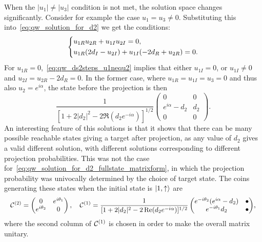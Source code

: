 When the $\lvert u_1 \rvert \neq \lvert u_3 \rvert$ condition is not met, the solution space changes significantly.
Consider for example the case $u_1 = u_3 \neq 0$. Substituting this into~\cref{eq:qw_solution_for_d2} we get the conditions:
\begin{equation}
	\begin{dcases}
		u_{1R}u_{2R} + u_{1I} u_{2I} = 0, \\
		u_{1R} (2d_I - u_{2I})
		+ u_{1I} (-2 d_R + u_{2R}) = 0.
	\end{dcases}
    \label{eq:qw_ds2steps_u1nequ2}
\end{equation}
For $u_{1R}=0$,~\cref{eq:qw_ds2steps_u1nequ2} implies that either $u_{1I}=0$,
or $u_{1I}\neq0$ and $u_{2I}=u_{2R}-2d_R=0$.
In the former case, where $u_{1R}=u_{1I}=u_3=0$ and thus also $u_2=e^{i\alpha}$, the state before the projection is then
\begin{equation}
    \frac{1}{[1 + 2\lvert d_2\rvert^2 - 2\Re(d_2e^{-i\alpha})]^{1/2}}
    \begin{pmatrix}
        0 & 0 \\
        e^{i\alpha} - d_2 & d_2 \\
        0 & 0
    \end{pmatrix}.
\end{equation}
An interesting feature of this solutions is that it shows that there can be many possible reachable states giving a target after projection, as any value of $d_2$ gives a valid different solution, with different solutions corresponding to different projection probabilities. This was not the case for~\cref{eq:qw_solution_for_d2_fullstate_matrixform}, in which the projection probability was univocally determined by the choice of target state.
The coins generating these states when the initial state is $\ket{1,\uparrow}$ are
\begin{equation}
\scalemath{0.95}{
    \calC^{(2)} = \begin{pmatrix}
        0 & e^{i\theta_1} \\ e^{i\theta_2} & 0
    \end{pmatrix},
    \quad
    \calC^{(1)} =
    \frac{1}{[1 + 2\lvert d_2\rvert^2 - 2\Re(d_2e^{-i\alpha})]^{1/2}}
    \begin{pmatrix}
        e^{-i\theta_2} (e^{i\alpha} - d_2) & \bullet \\
        e^{-i\theta_1} d_2 & \bullet
    \end{pmatrix}
},
\end{equation}
where the second column of ${\mathcal{C}}^{(1)}$ is chosen in order to make the overall matrix unitary.
